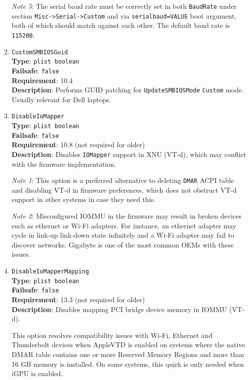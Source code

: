 \documentclass[]{article}
\begin{document}
\begin{enumerate}
  \emph{Note 5}: The serial baud rate must be correctly set in both \texttt{BaudRate} under section \texttt{Misc->Serial->Custom} and via
  \texttt{serialbaud=VALUE} boot argument, both of which should match against each other. The default baud rate is \texttt{115200}.

\item
  \texttt{CustomSMBIOSGuid}\\
  \textbf{Type}: \texttt{plist\ boolean}\\
  \textbf{Failsafe}: \texttt{false}\\
  \textbf{Requirement}: 10.4\\
  \textbf{Description}: Performs GUID patching for \texttt{UpdateSMBIOSMode}
  \texttt{Custom} mode. Usually relevant for Dell laptops.

\item
  \texttt{DisableIoMapper}\\
  \textbf{Type}: \texttt{plist\ boolean}\\
  \textbf{Failsafe}: \texttt{false}\\
  \textbf{Requirement}: 10.8 (not required for older)\\
  \textbf{Description}: Disables \texttt{IOMapper} support in XNU (VT-d),
  which may conflict with the firmware implementation.

  \emph{Note 1}: This option is a preferred alternative to deleting \texttt{DMAR}
  ACPI table and disabling VT-d in firmware preferences, which does not obstruct
  VT-d support in other systems in case they need this.

  \emph{Note 2}: Misconfigured IOMMU in the firmware may result in broken devices
  such as ethernet or Wi-Fi adapters. For instance, an ethernet adapter may cycle in link-up
  link-down state infinitely and a Wi-Fi adapter may fail to discover networks.
  Gigabyte is one of the most common OEMs with these issues.

\item
  \texttt{DisableIoMapperMapping}\\
  \textbf{Type}: \texttt{plist\ boolean}\\
  \textbf{Failsafe}: \texttt{false}\\
  \textbf{Requirement}: 13.3 (not required for older)\\
  \textbf{Description}: Disables mapping PCI bridge device memory in IOMMU (VT-d).

  This option resolves compatibility issues with Wi-Fi, Ethernet and
  Thunderbolt devices when AppleVTD is enabled on systems where the native DMAR table
  contains one or more Reserved Memory Regions and more than 16 GB memory is installed.
  On some systems, this quirk is only needed when iGPU is enabled.


\end{enumerate}
\end{document}

